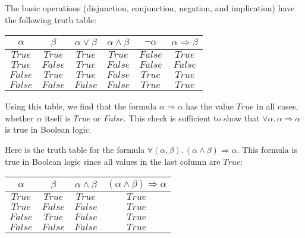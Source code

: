 The basic operations (disjunction, conjunction, negation, and implication)
have the following truth table:
\begin{center}
{\small{}}%
\begin{tabular}{|c|c|c|c|c|c|}
\hline 
{\small{}$\alpha$} & {\small{}$\beta$} & \textbf{\small{}$\alpha\vee\beta$} & \textbf{\small{}$\alpha\wedge\beta$} & \textbf{\small{}$\neg\alpha$} & \textbf{\small{}$\alpha\Rightarrow\beta$}\tabularnewline
\hline 
\hline 
{\small{}$True$} & {\small{}$True$} & {\small{}$True$} & {\small{}$True$} & {\small{}$False$} & {\small{}$True$}\tabularnewline
\hline 
{\small{}$True$} & {\small{}$False$} & {\small{}$True$} & {\small{}$False$} & {\small{}$False$} & {\small{}$False$}\tabularnewline
\hline 
{\small{}$False$} & {\small{}$True$} & {\small{}$True$} & {\small{}$False$} & {\small{}$True$} & {\small{}$True$}\tabularnewline
\hline 
{\small{}$False$} & {\small{}$False$} & {\small{}$False$} & {\small{}$False$} & {\small{}$True$} & {\small{}$True$}\tabularnewline
\hline 
\end{tabular}{\small\par}
\par\end{center}

Using this table, we find that the formula $\alpha\Rightarrow\alpha$
has the value $True$ in all cases, whether $\alpha$ itself is $True$
or $False$. This check is sufficient to show that $\forall\alpha.\,\alpha\Rightarrow\alpha$
is true in Boolean logic.

Here is the truth table for the formula $\forall(\alpha,\beta).\,(\alpha\wedge\beta)\Rightarrow\alpha$.
This formula is true in Boolean logic since all values in the last
column are $True$:
\begin{center}
{\small{}}%
\begin{tabular}{|c|c|c|c|}
\hline 
{\small{}$\alpha$} & {\small{}$\beta$} & \textbf{\small{}$\alpha\wedge\beta$} & {\small{}$(\alpha\wedge\beta)\Rightarrow\alpha$}\tabularnewline
\hline 
\hline 
{\small{}$True$} & {\small{}$True$} & {\small{}$True$} & {\small{}$True$}\tabularnewline
\hline 
{\small{}$True$} & {\small{}$False$} & {\small{}$False$} & {\small{}$True$}\tabularnewline
\hline 
{\small{}$False$} & {\small{}$True$} & {\small{}$False$} & {\small{}$True$}\tabularnewline
\hline 
{\small{}$False$} & {\small{}$False$} & {\small{}$False$} & {\small{}$True$}\tabularnewline
\hline 
\end{tabular}{\small\par}
\par\end{center}

